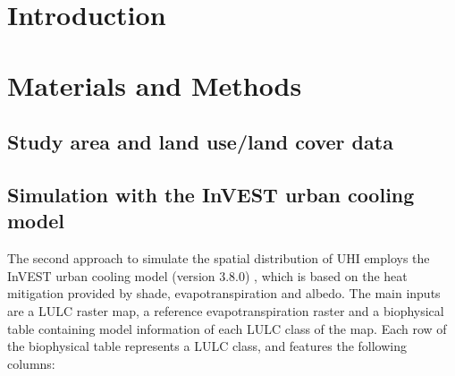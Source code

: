 \documentclass[12pt]{iopart}
\begin{document}

\author{Mart\'i Bosch$^1$}

\address{$^1$ Urban and Regional Planning Community (CEAT), \'Ecole Polytechnique F\'ed\'erale de Lausanne (EPFL), Lausanne, Switzerland}

\begin{abstract}

\end{abstract}

%
%
%
% 
%



\section{Introduction}



\section{Materials and Methods}

\subsection{Study area and land use/land cover data}



\subsection{Simulation with the InVEST urban cooling model}

The second approach to simulate the spatial distribution of UHI employs the InVEST urban cooling model (version 3.8.0) \cite{sharp2020invest}, which is based on the heat mitigation provided by shade, evapotranspiration and albedo.
The main inputs are a LULC raster map, a reference evapotranspiration raster and a biophysical table containing model information of each LULC class of the map. Each row of the biophysical table represents a LULC class, and features the following columns:
\end{document}

